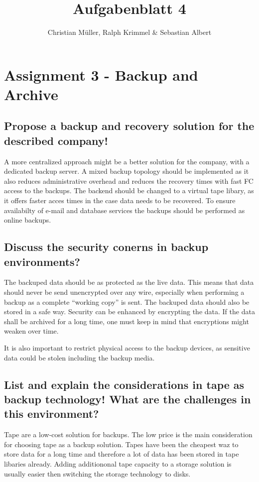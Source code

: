 \documentclass{article}
\title{Aufgabenblatt 4}
\author{Christian Müller, Ralph Krimmel \& Sebastian Albert }
\begin{document}
\maketitle

\section*{Assignment 3 - Backup and Archive}

\subsection{Propose a backup and recovery solution for the described company!}
	A more centralized approach might be a better solution for the company,
	with a dedicated backup server.
	A mixed backup topology should be implemented as it also reduces administrative overhead
	and reduces the recovery times with fast FC access to the backups.
	The backend should be changed to a virtual tape libary,
	as it offers faster acces times in the case data needs to be recovered.
	To ensure availabilty of e-mail and database services
	the backups should be performed as online backups.

\subsection{Discuss the security conerns in backup environments?}
		The backuped data should be as protected as the live data.
		This means that data should never be send unencrypted over any wire,
		especially when performing a backup
		as a complete ``working copy'' is sent.
		The backuped data should also be stored in a safe way.
		Security can be enhanced by encrypting the data.
		If the data shall be archived for a long time,
		one must keep in mind that encryptions might weaken over time.

		It is also important to restrict physical access to the backup devices,
		as sensitive data could be stolen including the backup media.

\subsection{List and explain the considerations in tape as backup technology!
				What are the challenges in this environment?}
	Tape are a low-cost solution for backups.
	The low price is the main consideration for choosing tape as a backup solution.
	Tapes have been the cheapest waz to store data for a long time
	and therefore a lot of data has been stored in tape libaries already.
	Adding additiononal tape capacity to a storage solution is usually easier 
	then switching the storage technology to disks.
	
\end{document}
